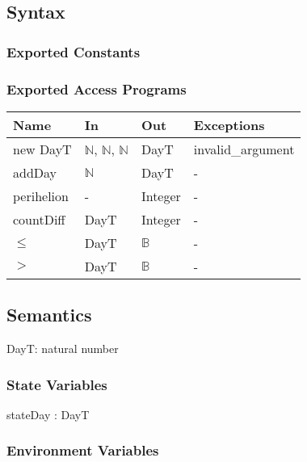 \documentclass[12pt, titlepage]{article}
\begin{document}
\subsection{Syntax}

\subsubsection{Exported Constants}


\subsubsection{Exported Access Programs}

\begin{center}
\begin{tabular}{p{3cm} p{5cm} p{4cm} p{2cm}}
\hline
\textbf{Name} & \textbf{In} & \textbf{Out} & \textbf{Exceptions} \\
\hline
new DayT& $\mathbb{N}$, $\mathbb{N}$, $\mathbb{N}$ & DayT & invalid\_argument \\
addDay &  $\mathbb{N}$  & DayT & - \\
perihelion &  -  & Integer & - \\
countDiff &  DayT  & Integer & - \\
$\leq$ &  DayT  & $\mathbb{B}$ & - \\
$>$ &  DayT  & $\mathbb{B}$ & - \\
\hline
\end{tabular}
\end{center}

 

\subsection{Semantics}
DayT: natural number

\subsubsection{State Variables}

stateDay : DayT \\

\subsubsection{Environment Variables}
\end{document}
